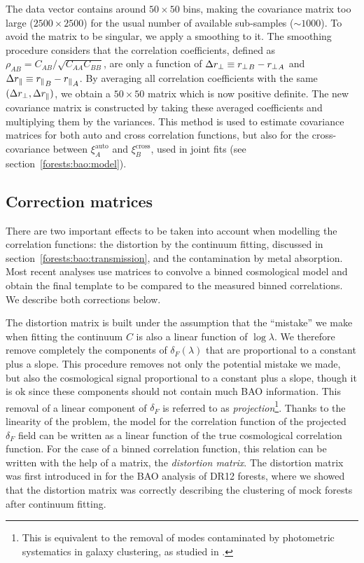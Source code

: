 The data vector contains around $50 \times 50$ bins, making the covariance matrix too large ($2500 \times 2500$)
for the usual number of available sub-samples ($\sim 1000$). To avoid the matrix to be 
singular, we apply a smoothing to it. The smoothing procedure considers that the 
correlation coefficients, defined as $\rho_{AB} = C_{AB}/\sqrt{C_{AA} C_{BB}}$, 
are only a function of $\Delta {r_\perp} \equiv {r_\perp}_B - {r_\perp}_A$ and 
$\Delta {r_\parallel} \equiv {r_\parallel}_B - {r_\parallel}_A$. By averaging all correlation coefficients
with the same $(\Delta {r_\perp}, \Delta {r_\parallel})$, we obtain a $50 \times 50$ matrix which is now 
positive definite. The new covariance matrix is constructed by taking these averaged 
coefficients and multiplying them by the variances. This method is used to estimate 
covariance matrices for both auto and cross correlation functions, but also for the 
cross-covariance between $\xi^\mathrm{auto}_A$ and $\xi^\mathrm{cross}_B$, used in 
joint fits (see section~\ref{forests:bao:model}).



\subsection{Correction matrices}
\label{forests:bao:matrices}

There are two important effects to be taken into account when modelling 
the \lya correlation functions: the distortion by the continuum fitting, discussed 
in section~\ref{forests:bao:transmission}, and the contamination by metal 
absorption. Most recent analyses use matrices to convolve a binned 
cosmological model and obtain the final template to be compared to 
the measured binned correlations. We describe both corrections below. 

The distortion matrix is built under the assumption that the ``mistake''
we make when fitting the continuum $C$ is also a linear function 
of $\log \lambda$. We therefore remove completely the components of $\delta_F(\lambda)$
that are proportional to a constant plus a slope. This procedure removes
not only the potential mistake we made, 
but also the cosmological signal proportional to a constant plus a slope,
though it is ok since these components should not contain much BAO information.
This removal of a linear component of $\delta_F$ is referred to as 
\emph{projection}\footnote{This is equivalent to the removal of modes 
contaminated by photometric systematics in galaxy clustering, as studied 
in \cite{paviotAngularSystematicsfreeCosmological2022}.}.
Thanks to the linearity of the problem, the model for the correlation function of 
the projected $\delta_F$ field can be written as a linear function of the 
true cosmological correlation function. For the case of a binned correlation function, 
this relation can be written with the help of a matrix, the \emph{distortion matrix}.
The distortion matrix was first introduced in \cite{bautistaMeasurementBaryonAcoustic2017}
for the BAO analysis of DR12 forests, where we showed that the distortion matrix 
was correctly describing the clustering of mock forests after continuum fitting. 

